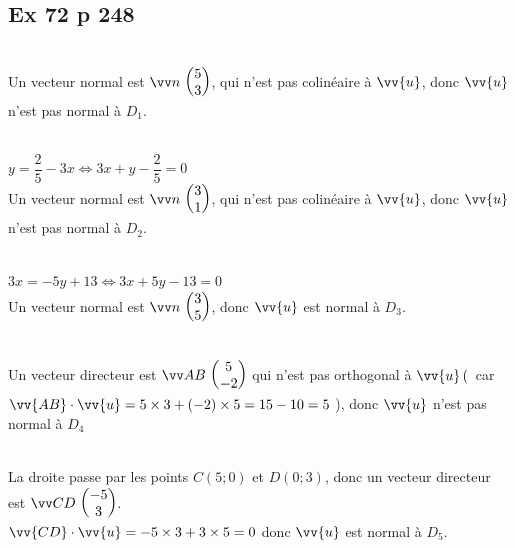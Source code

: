 \documentclass[12pt,a4paper]{book}
\begin{document}
\subsection*{Ex 72 p 248}
\begin{enumMet}
    \item {}\\
    Un vecteur normal est $\Coord{n}{5}{3}$, qui n'est pas colinéaire à $\vv{u}$, donc $\vv{u}$ n'est pas normal à $D_{1}$.
    \item {}\\
    $y=\dfrac{2}{5}-3 x \iff 3x+y-\dfrac{2}{5}=0$\\
    Un vecteur normal est $\Coord{n}{3}{1}$, qui n'est pas colinéaire à $\vv{u}$, donc $\vv{u}$ n'est pas normal à $D_{2}$.
    \item {}\\
    $3 x=-5 y+13 \iff 3x+5y-13=0$\\
    Un vecteur normal est $\Coord{n}{3}{5}$, donc $\vv{u}$ est normal à $D_{3}$.
    \item {}\\
    Un vecteur directeur est $\Coord{AB}{5}{-2}$ qui n'est pas orthogonal à $\vv{u}\left(\right.$ car $\vv{A B} \cdot \vv{u}=5 \times 3+(-2) \times 5=15-10=5$ ), donc $\vv{u}$ n'est pas normal à $D_{4}$
    \item {}\\
    La droite passe par les points $C(5 ; 0)$ et $D(0 ; 3)$, donc un vecteur directeur est $\Coord{CD}{-5}{3}$.\\
    $\vv{C D} \cdot \vv{u}=-5 \times 3+3 \times 5=0$ donc $\vv{u}$ est normal à $D_{5}$.    
\end{enumMet}
\end{document}
